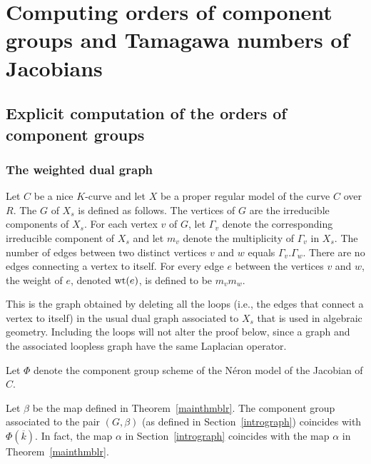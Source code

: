 \chapter{Computing orders of component groups and Tamagawa numbers of Jacobians}\label{papertwo}

\section{Explicit computation of the orders of component groups}\label{compgroup}
\subsection{The weighted dual graph}\label{weightdualgraph}
Let $C$ be a nice $K$-curve and let $X$ be a proper regular model of the curve $C$ over $R$. The {} $G$ of $X_s$ is defined as follows. The vertices of $G$ are the irreducible components of $X_s$. For each vertex $v$ of $G$, let $\Gamma_v$ denote the corresponding irreducible component of $X_s$ and let $m_v$ denote the multiplicity of $\Gamma_v$ in $X_s$. The number of edges between two distinct vertices $v$ and $w$ equals $\Gamma_v.\Gamma_w$. There are no edges connecting a vertex to itself. For every edge $e$ between the vertices $v$ and $w$, the  weight of $e$, denoted $\operatorname{wt}(e)$, is defined to be $m_v m_w$. 

\begin{rmk}
 This is the graph obtained by deleting all the loops (i.e., the edges that connect a vertex to itself) in the usual dual graph associated to $X_s$ that is used in algebraic geometry. Including the loops will not alter the proof below, since a graph and the associated loopless graph have the same Laplacian operator.
\end{rmk}

Let $\Phi$ denote the component group scheme of the N\'{e}ron model of the Jacobian of $C$. 

\begin{rmk}
 Let $\beta$ be the map defined in Theorem~\ref{mainthmblr}. The component group associated to the pair $(G,\beta)$ (as defined in Section~\ref{intrograph}) coincides with $\Phi(\overline{k})$. In fact, the map $\alpha$ in Section~\ref{intrograph} coincides with the map $\alpha$ in Theorem~\ref{mainthmblr}.
\end{rmk}


